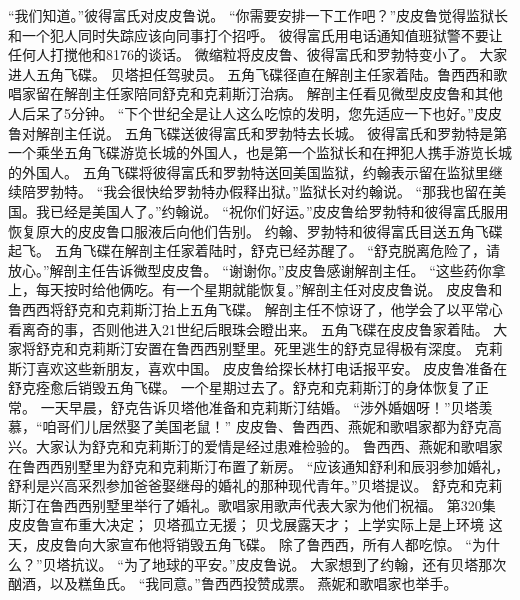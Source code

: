 \documentclass[a4paper,12pt,UTF8,twoside]{ctexbook}
\begin{document}
        “我们知道。”彼得富氏对皮皮鲁说。  
        “你需要安排一下工作吧？”皮皮鲁觉得监狱长和一个犯人同时失踪应该向同事打个招呼。  
        彼得富氏用电话通知值班狱警不要让任何人打搅他和8176的谈话。  
        微缩粒将皮皮鲁、彼得富氏和罗勃特变小了。  
        大家进人五角飞碟。  
        贝塔担任驾驶员。        
        五角飞碟径直在解剖主任家着陆。鲁西西和歌唱家留在解剖主任家陪同舒克和克莉斯汀治病。  
        解剖主任看见微型皮皮鲁和其他人后呆了5分钟。  
        “下个世纪全是让人这么吃惊的发明，您先适应一下也好。”皮皮鲁对解剖主任说。  
        五角飞碟送彼得富氏和罗勃特去长城。  
        彼得富氏和罗勃特是第一个乘坐五角飞碟游览长城的外国人，也是第一个监狱长和在押犯人携手游览长城的外国人。  
        五角飞碟将彼得富氏和罗勃特送回美国监狱，约翰表示留在监狱里继续陪罗勃特。  
        “我会很快给罗勃特办假释出狱。”监狱长对约翰说。  
        “那我也留在美国。我已经是美国人了。”约翰说。  
        “祝你们好运。”皮皮鲁给罗勃特和彼得富氏服用恢复原大的皮皮鲁口服液后向他们告别。  
        约翰、罗勃特和彼得富氏目送五角飞碟起飞。  
        五角飞碟在解剖主任家着陆时，舒克已经苏醒了。  
        “舒克脱离危险了，请放心。”解剖主任告诉微型皮皮鲁。  
        “谢谢你。”皮皮鲁感谢解剖主任。  
        “这些药你拿上，每天按时给他俩吃。有一个星期就能恢复。”解剖主任对皮皮鲁说。  
        皮皮鲁和鲁西西将舒克和克莉斯汀抬上五角飞碟。  
        解剖主任不惊讶了，他学会了以平常心看离奇的事，否则他进入21世纪后眼珠会瞪出来。  
        五角飞碟在皮皮鲁家着陆。  
        大家将舒克和克莉斯汀安置在鲁西西别墅里。死里逃生的舒克显得极有深度。  
        克莉斯汀喜欢这些新朋友，喜欢中国。  
        皮皮鲁给探长林打电话报平安。  
        皮皮鲁准备在舒克痊愈后销毁五角飞碟。  
        一个星期过去了。舒克和克莉斯汀的身体恢复了正常。  
        一天早晨，舒克告诉贝塔他准备和克莉斯汀结婚。  
        “涉外婚姻呀！”贝塔羡慕，“咱哥们儿居然娶了美国老鼠！”  
        皮皮鲁、鲁西西、燕妮和歌唱家都为舒克高兴。大家认为舒克和克莉斯汀的爱情是经过患难检验的。  
        鲁西西、燕妮和歌唱家在鲁西西别墅里为舒克和克莉斯汀布置了新房。  
        “应该通知舒利和辰羽参加婚礼，舒利是兴高采烈参加爸爸娶继母的婚礼的那种现代青年。”贝塔提议。  
        舒克和克莉斯汀在鲁西西别墅里举行了婚礼。歌唱家用歌声代表大家为他们祝福。          第320集  
        皮皮鲁宣布重大决定；  
        贝塔孤立无援；  
        贝戈展露天才；  
        上学实际上是上环境    
        这天，皮皮鲁向大家宣布他将销毁五角飞碟。  
        除了鲁西西，所有人都吃惊。  
        “为什么？”贝塔抗议。  
        “为了地球的平安。”皮皮鲁说。  
        大家想到了约翰，还有贝塔那次酗酒，以及糕鱼氏。  
        “我同意。”鲁西西投赞成票。  
        燕妮和歌唱家也举手。  
\end{document}
